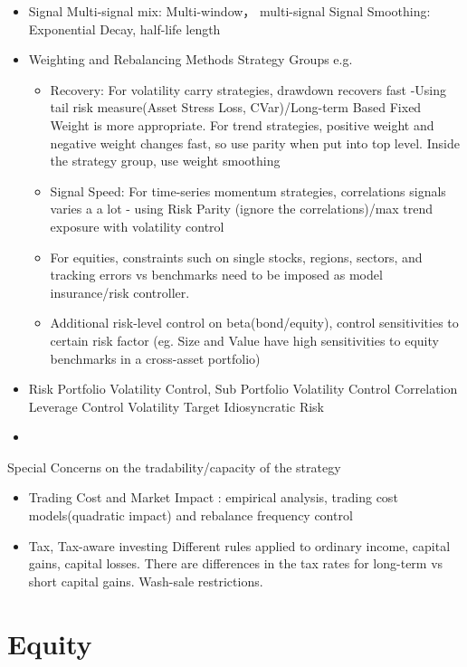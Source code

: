 \documentclass[11pt, openany]{book}              %
\begin{document}
\begin{itemize}
	\item Signal
		\subitem Multi-signal mix: Multi-window， multi-signal
		\subitem Signal Smoothing:
			\subsubitem Exponential Decay, half-life length
	\item Weighting and Rebalancing Methods
		\subitem Strategy Groups
		\subitem e.g.
		\begin{itemize}
			\item Recovery: For volatility carry strategies, drawdown recovers fast -Using tail risk measure(Asset Stress Loss, CVar)/Long-term Based Fixed Weight is more appropriate. For trend strategies, positive weight and negative weight changes fast, so use parity when put into top level. Inside the strategy group, use weight smoothing
			\item Signal Speed: For time-series momentum strategies, correlations signals varies a a lot - using Risk Parity (ignore the correlations)/max trend exposure with volatility control
			\item For equities, constraints such on single stocks, regions, sectors, and tracking errors vs benchmarks need to be imposed as model insurance/risk controller.
			\item Additional risk-level control on beta(bond/equity), control sensitivities to certain risk factor (eg. Size and Value have high sensitivities to equity benchmarks in a cross-asset portfolio)
		\end{itemize}
	\item Risk
		\subitem Portfolio Volatility Control, Sub Portfolio Volatility Control 
		\subitem Correlation
		\subitem Leverage Control
		\subitem Volatility Target
		\subitem Idiosyncratic Risk 
	\item 
\end{itemize}

Special Concerns on the tradability/capacity of the strategy

\begin{itemize}
	\item Trading Cost and Market Impact : empirical analysis, trading cost models(quadratic impact) and rebalance frequency control
	\item Tax, Tax-aware investing
		\subitem Different rules applied to ordinary income, capital gains, capital losses. There are differences in the tax rates for long-term vs short capital gains. Wash-sale restrictions.
\end{itemize}


\section{Equity}
\end{document}
